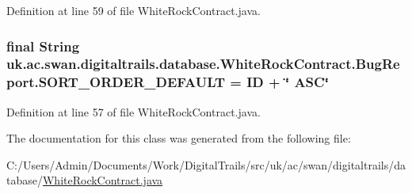 Definition at line 59 of file White\+Rock\+Contract.\+java.

\hypertarget{classuk_1_1ac_1_1swan_1_1digitaltrails_1_1database_1_1_white_rock_contract_1_1_bug_report_a9ffe10ee3fb21442adf0d23d84d03bf9}{
\subsubsection[{S\+O\+R\+T\+\_\+\+O\+R\+D\+E\+R\+\_\+\+D\+E\+F\+A\+U\+L\+T}]{\setlength{\rightskip}{0pt plus 5cm}final String uk.\+ac.\+swan.\+digitaltrails.\+database.\+White\+Rock\+Contract.\+Bug\+Report.\+S\+O\+R\+T\+\_\+\+O\+R\+D\+E\+R\+\_\+\+D\+E\+F\+A\+U\+L\+T = I\+D + \char`\"{} A\+S\+C\char`\"{}\hspace{0.3cm}{\ttfamily [static]}}}\label{classuk_1_1ac_1_1swan_1_1digitaltrails_1_1database_1_1_white_rock_contract_1_1_bug_report_a9ffe10ee3fb21442adf0d23d84d03bf9}


Definition at line 57 of file White\+Rock\+Contract.\+java.



The documentation for this class was generated from the following file\+:\begin{DoxyCompactItemize}
\item 
C\+:/\+Users/\+Admin/\+Documents/\+Work/\+Digital\+Trails/src/uk/ac/swan/digitaltrails/database/\hyperlink{_white_rock_contract_8java}{White\+Rock\+Contract.\+java}\end{DoxyCompactItemize}

